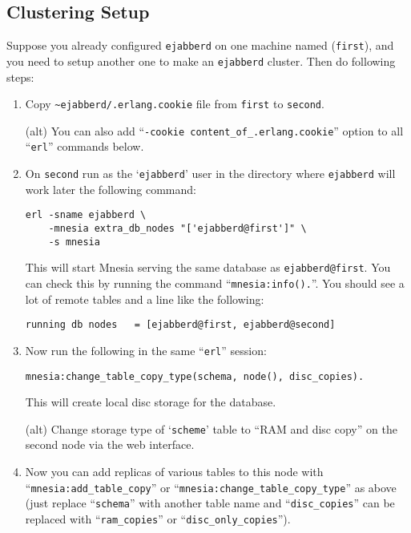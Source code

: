 \documentclass[a4paper,10pt]{article}
\newcommand{\ind}[1]{\begin{latexonly}\index{#1}\end{latexonly}}
\newcommand{\node}[1]{\texttt{#1}}
\newcommand{\term}[1]{\texttt{#1}}
\newcommand{\shell}[1]{\texttt{#1}}
\newcommand{\ejabberd}{\texttt{ejabberd}}
\begin{document}
\subsection{Clustering Setup}
\label{sec:cluster}
\ind{clustering!setup}

Suppose you already configured \ejabberd{} on one machine named (\term{first}),
and you need to setup another one to make an \ejabberd{} cluster. Then do
following steps:

\begin{enumerate}
\item Copy \verb|~ejabberd/.erlang.cookie| file from \term{first} to
  \term{second}.

  (alt) You can also add ``\verb|-cookie content_of_.erlang.cookie|''
  option to all ``\shell{erl}'' commands below.

\item On \term{second} run as the `\term{ejabberd}' user in the directory
  where \ejabberd{} will work later the following command:

\begin{verbatim}
erl -sname ejabberd \
    -mnesia extra_db_nodes "['ejabberd@first']" \
    -s mnesia
\end{verbatim}

  This will start Mnesia serving the same database as \node{ejabberd@first}.
  You can check this by running the command ``\verb|mnesia:info().|''. You
  should see a lot of remote tables and a line like the following:

\begin{verbatim}
running db nodes   = [ejabberd@first, ejabberd@second]
\end{verbatim}


\item Now run the following in the same ``\shell{erl}'' session:

\begin{verbatim}
mnesia:change_table_copy_type(schema, node(), disc_copies).
\end{verbatim}

  This will create local disc storage for the database.

  (alt) Change storage type of `\term{scheme}' table to ``RAM and disc
  copy'' on the second node via the web interface.


\item Now you can add replicas of various tables to this node with
  ``\verb|mnesia:add_table_copy|'' or
  ``\verb|mnesia:change_table_copy_type|'' as above (just replace
  ``\verb|schema|'' with another table name and ``\verb|disc_copies|''
  can be replaced with ``\verb|ram_copies|'' or
  ``\verb|disc_only_copies|'').


\end{enumerate}
\end{document}
